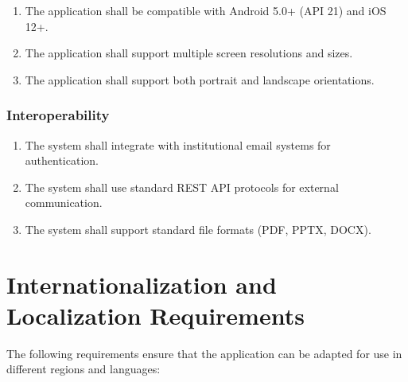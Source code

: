 \documentclass[12pt,a4paper]{article}
\begin{document}
\begin{enumerate}[leftmargin=*, label=\textbf{PO-\arabic*.}, itemsep=4pt]
  \item The application shall be compatible with Android 5.0+ (API 21) and iOS 12+.
  \item The application shall support multiple screen resolutions and sizes.
  \item The application shall support both portrait and landscape orientations.
\end{enumerate}

\subsubsection{Interoperability}

\begin{enumerate}[leftmargin=*, label=\textbf{IN-\arabic*.}, itemsep=4pt]
  \item The system shall integrate with institutional email systems for authentication.
  \item The system shall use standard REST API protocols for external communication.
  \item The system shall support standard file formats (PDF, PPTX, DOCX).
\end{enumerate}
\newpage

\newpage
\section{Internationalization and Localization Requirements}

The following requirements ensure that the application can be adapted for use in different regions and languages:
\end{document}
